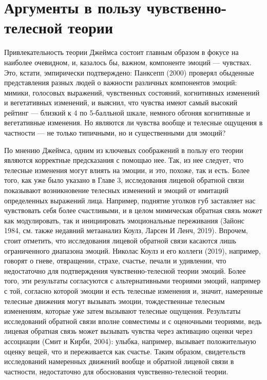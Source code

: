 \documentclass[11pt]{book}
\begin{document}
\section{Аргументы в пользу чувственно-телесной теории}

Привлекательность теории Джеймса состоит главным образом в фокусе на наиболее очевидном, и, казалось бы, важном, компоненте эмоций --- чувствах. Это, кстати, эмпирически подтверждено: Панксепп (2000) проверял обыденные представления разных людей о важности различных компонентов эмоций: мимики, голосовых выражений, чувственных состояний, когнитивных изменений и вегетативных изменений, и выяснил, что чувства имеют самый высокий рейтинг --- близкий к 4 по 5-балльной шкале, немного обгоняя когнитивные и вегетативные изменения. Но являются ли чувства вообще и телесные ощущения в частности --- не только типичными, но и существенными для эмоций?

По мнению Джеймса, одним из ключевых соображений в пользу его теории являются корректные предсказания с помощью нее. Так, из нее следует, что телесные изменения могут влиять на эмоции, и это, похоже, так и есть. Более того, как уже было указано в Главе 3, исследования лицевой обратной связи показывают возникновение телесных изменений и эмоций от имитаций определенных выражений лица. Например, поднятие уголков губ заставляет нас чувствовать себя более счастливыми, и в целом мимическая обратная связь может как модулировать, так и инициировать эмоциональные переживания (Зайонс 1984, см. также недавний метаанализ Коулз, Ларсен И Ленч, 2019). Впрочем, стоит отметить, что исследования лицевой обратной связи касаются лишь ограниченного диапазона эмоций. Николас Коулз и его коллеги (2019), например, говорят о гневе, отвращении, страхе, счастье, печали и удивлении, что недостаточно для подтверждения чувственно-телесной теории эмоций. Более того, эти результаты согласуются с альтернативными теориями эмоций, например с той, согласно которой эмоции и есть телесные изменения и, значит, намеренные телесные движения могут вызывать эмоции, тождественные телесным изменениям, которые уже затем вызывают телесные ощущения. Результаты исследований обратной связи вполне совместимы и с оценочными теориями, ведь лицевая обратная связь может вызывать чувства через активацию оценки через ассоциации (Смит и Кирби, 2004): улыбка, например, вызывает положительную оценку вещей, что и переживается как счастье. Таким образом, свидетельств исследований намеренных движений вообще и обратной лицевой связи в частности, недостаточно для обоснования чувственно-телесной теории.
\end{document}
